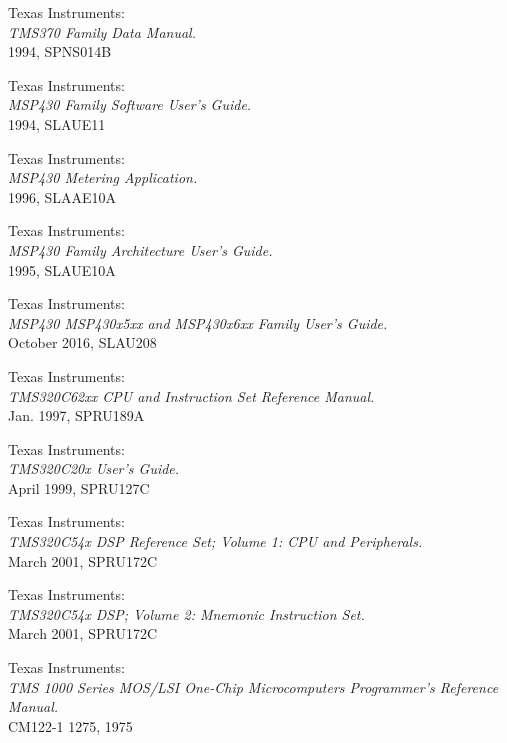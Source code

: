  Texas Instruments: \\
                {\em TMS370 Family Data Manual.\/} \\
                1994, SPNS014B

 Texas Instruments: \\
                       {\em MSP430 Family Software User's Guide.\/} \\
                       1994, SLAUE11

 Texas Instruments: \\
                   {\em MSP430 Metering Application.\/} \\
                   1996, SLAAE10A

 Texas Instruments: \\
                       {\em MSP430 Family Architecture User's Guide.\/} \\
                       1995, SLAUE10A

 Texas Instruments: \\
                 {\em MSP430 MSP430x5xx and MSP430x6xx Family
                  User's Guide.\/} \\
                 October 2016, SLAU208

 Texas Instruments: \\
                {\em TMS320C62xx CPU and Instruction Set Reference
                 Manual.\/} \\
                Jan. 1997, SPRU189A

 Texas Instruments: \\
                 {\em TMS320C20x User's Guide.\/} \\
                 April 1999, SPRU127C

 Texas Instruments: \\
                     {\em TMS320C54x DSP Reference Set;
                     Volume 1: CPU and Peripherals.\/} \\
                     March 2001, SPRU172C

 Texas Instruments: \\
                     {\em TMS320C54x DSP; Volume 2: Mnemonic Instruction
                     Set.\/} \\
                     March 2001, SPRU172C

 Texas Instruments: \\
                     {\em TMS 1000 Series MOS/LSI One-Chip
                     Microcomputers Programmer's Reference
                     Manual.\/} \\
                     CM122-1 1275, 1975

